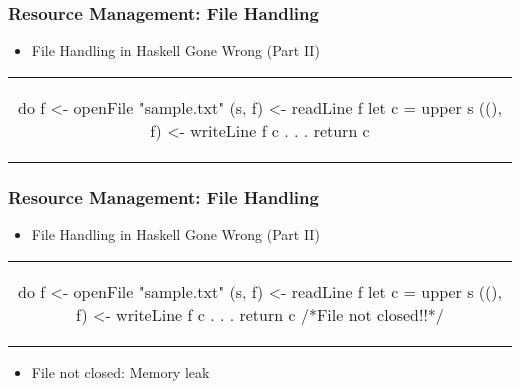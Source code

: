 \begin{frame}[fragile, c]
  \frametitle{Resource Management: File Handling}
  \begin{center}

  \begin{itemize}
  \item File Handling in Haskell Gone Wrong (Part II)
  \end{itemize}
  \begin{tabular}[h]{c}
    \begin{haskell}
    do f  <- openFile "sample.txt"
       (s, f)  <- readLine f
       let c = upper s
       ((), f) <- writeLine f c
           .
           .
           .
       return c
     \end{haskell}
  \end{tabular}

\end{center}
\end{frame}

\begin{frame}[fragile, c]
  \frametitle{Resource Management: File Handling}
  \begin{center}

  \begin{itemize}
  \item File Handling in Haskell Gone Wrong (Part II)
  \end{itemize}
  \begin{tabular}[h]{c}
    \begin{haskell}
    do f  <- openFile "sample.txt"
       (s, f)  <- readLine f
       let c = upper s
       ((), f) <- writeLine f c
           .
           .
           .
       return c /*File not closed!!*/
     \end{haskell}
  \end{tabular}
  \begin{itemize}
  \item File not closed: Memory leak
  \end{itemize}
  \end{center}
\end{frame}

